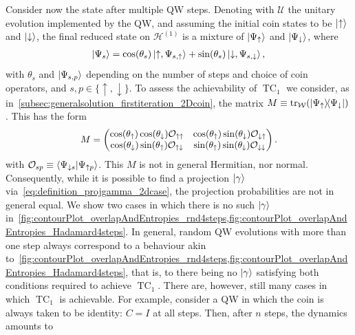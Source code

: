 \documentclass[
	aps, pra,
	superscriptaddress, twocolumn,
	floatfix,
	10pt
]{revtex4-1}
\newcommand{\on}[1]{\operatorname{#1}}
\newcommand{\parTitle}[1]{\noindent{\color{Mahogany}(\emph{#1})}}
\newcommand{\calH}{{\mathcal{H}}}
\newcommand{\calO}{{\mathcal{O}}}
\newcommand{\calU}{{\mathcal{U}}}
\newcommand{\calW}{{\mathcal{W}}}
\newcommand{\commale}[1]{{\textcolor{red} {\it{[Note (Ale): #1]}}}}
\renewcommand{\parTitle}[1]{}
\begin{document}
\parTitle{Multiple steps}
Consider now the state after multiple QW steps.
Denoting with $\calU$ the unitary evolution implemented by the QW, and assuming the initial coin states to be $\ket\uparrow$ and $\ket\downarrow$, the final reduced state on $\calH^{(1)}$ is a mixture of $\ket{\Psi_\uparrow}$ and $\ket{\Psi_\downarrow}$, where
\begin{equation}
\begin{aligned}
	\ket{\Psi_s} =
	\cos(\theta_s) \ket{\uparrow,\Psi_{s,\uparrow}} +
	\sin(\theta_s) \ket{\downarrow,\Psi_{s,\downarrow}},
\end{aligned}
\end{equation}
with $\theta_s$ and $\ket{\Psi_{s,p}}$ depending on the number of steps and choice of coin operators, and $s,p\in\{\uparrow,\downarrow\}$.
To assess the achievability of $\on{TC}_1$ we consider, as in~\cref{subsec:generalsolution_firstiteration_2Dcoin}, the matrix
$M\equiv \tr_{\calW}(\ketbra{\Psi_\uparrow}{\Psi_\downarrow})$.
This has the form
\begin{equation}\scalebox{0.97}{$\displaystyle
	M = \begin{pmatrix}
		\cos(\theta_\uparrow)\cos(\theta_\downarrow) \calO_{\uparrow\uparrow} &
		\cos(\theta_\uparrow)\sin(\theta_{\downarrow}) \calO_{\downarrow\uparrow} \\
		\cos(\theta_\downarrow)\sin(\theta_{\uparrow}) \calO_{\uparrow\downarrow} &
		\sin(\theta_\uparrow)\sin(\theta_\downarrow) \calO_{\downarrow\downarrow}
	\end{pmatrix}.
$}\end{equation}
with
$\calO_{sp}\equiv\braket{\Psi_{\downarrow s}}{\Psi_{\uparrow p}}$.
This $M$ is not in general Hermitian, nor normal. Consequently, while it is possible to find a projection $\ket\gamma$ via~\cref{eq:definition_projgamma_2dcase}, the projection probabilities are not in general equal. We show two cases in which there is no such $\ket\gamma$ in~\cref{fig:contourPlot_overlapAndEntropies_rnd4steps,fig:contourPlot_overlapAndEntropies_Hadamard4steps}.
In general, random QW evolutions with more than one step always correspond to a behaviour akin to~\cref{fig:contourPlot_overlapAndEntropies_rnd4steps,fig:contourPlot_overlapAndEntropies_Hadamard4steps}, that is, to there being no $\ket\gamma$ satisfying both conditions required to achieve $\on{TC}_1$.
There are, however, still many cases in which $\on{TC}_1$ is achievable. For example, consider a QW in which the coin is always taken to be identity: $C=I$ at all steps. Then, after $n$ steps, the dynamics amounts to
\end{document}
